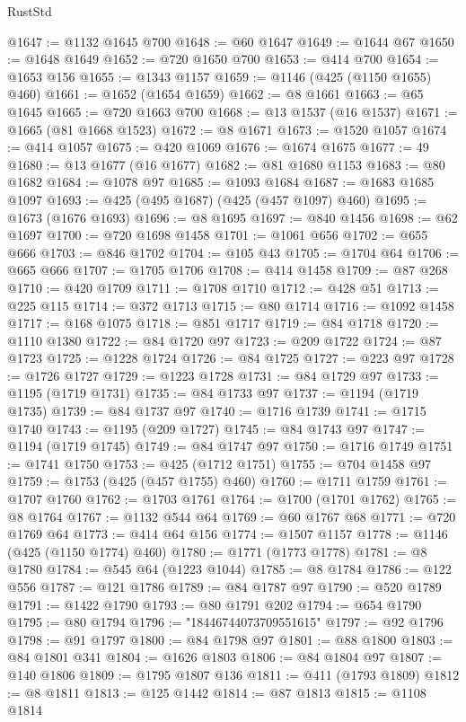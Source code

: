 \begin{lexlean}{RustStd}
\begin{coremodule}
@1647 := @1132 @1645 @700
@1648 := @60 @1647
@1649 := @1644 @67
@1650 := @1648 @1649
@1652 := @720 @1650 @700
@1653 := @414 @700
@1654 := @1653 @156
@1655 := @1343 @1157
@1659 := @1146 (@425 (@1150 @1655) @460)
@1661 := @1652 (@1654 @1659)
@1662 := @8 @1661
@1663 := @65 @1645
@1665 := @720 @1663 @700
@1668 := @13 @1537 (@16 @1537)
@1671 := @1665 (@81 @1668 @1523)
@1672 := @8 @1671
@1673 := @1520 @1057
@1674 := @414 @1057
@1675 := @420 @1069
@1676 := @1674 @1675
@1677 := 49
@1680 := @13 @1677 (@16 @1677)
@1682 := @81 @1680 @1153
@1683 := @80 @1682
@1684 := @1078 @97
@1685 := @1093 @1684
@1687 := @1683 @1685 @1097
@1693 := @425 (@495 @1687) (@425 (@457 @1097) @460)
@1695 := @1673 (@1676 @1693)
@1696 := @8 @1695
@1697 := @840 @1456
@1698 := @62 @1697
@1700 := @720 @1698 @1458
@1701 := @1061 @656
@1702 := @655 @666
@1703 := @846 @1702
@1704 := @105 @43
@1705 := @1704 @64
@1706 := @665 @666
@1707 := @1705 @1706
@1708 := @414 @1458
@1709 := @87 @268
@1710 := @420 @1709
@1711 := @1708 @1710
@1712 := @428 @51
@1713 := @225 @115
@1714 := @372 @1713
@1715 := @80 @1714
@1716 := @1092 @1458
@1717 := @168 @1075
@1718 := @851 @1717
@1719 := @84 @1718
@1720 := @1110 @1380
@1722 := @84 @1720 @97
@1723 := @209 @1722
@1724 := @87 @1723
@1725 := @1228 @1724
@1726 := @84 @1725
@1727 := @223 @97
@1728 := @1726 @1727
@1729 := @1223 @1728
@1731 := @84 @1729 @97
@1733 := @1195 (@1719 @1731)
@1735 := @84 @1733 @97
@1737 := @1194 (@1719 @1735)
@1739 := @84 @1737 @97
@1740 := @1716 @1739
@1741 := @1715 @1740
@1743 := @1195 (@209 @1727)
@1745 := @84 @1743 @97
@1747 := @1194 (@1719 @1745)
@1749 := @84 @1747 @97
@1750 := @1716 @1749
@1751 := @1741 @1750
@1753 := @425 (@1712 @1751)
@1755 := @704 @1458 @97
@1759 := @1753 (@425 (@457 @1755) @460)
@1760 := @1711 @1759
@1761 := @1707 @1760
@1762 := @1703 @1761
@1764 := @1700 (@1701 @1762)
@1765 := @8 @1764
@1767 := @1132 @544 @64
@1769 := @60 @1767 @68
@1771 := @720 @1769 @64
@1773 := @414 @64 @156
@1774 := @1507 @1157
@1778 := @1146 (@425 (@1150 @1774) @460)
@1780 := @1771 (@1773 @1778)
@1781 := @8 @1780
@1784 := @545 @64 (@1223 @1044)
@1785 := @8 @1784
@1786 := @122 @556
@1787 := @121 @1786
@1789 := @84 @1787 @97
@1790 := @520 @1789
@1791 := @1422 @1790
@1793 := @80 @1791 @202
@1794 := @654 @1790
@1795 := @80 @1794
@1796 := "18446744073709551615"
@1797 := @92 @1796
@1798 := @91 @1797
@1800 := @84 @1798 @97
@1801 := @88 @1800
@1803 := @84 @1801 @341
@1804 := @1626 @1803
@1806 := @84 @1804 @97
@1807 := @140 @1806
@1809 := @1795 @1807 @136
@1811 := @411 (@1793 @1809)
@1812 := @8 @1811
@1813 := @125 @1442
@1814 := @87 @1813
@1815 := @1108 @1814

\end{coremodule}
\end{lexlean}
